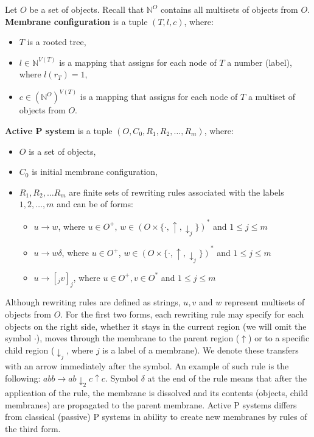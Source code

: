 Let $O$ be a set of objects. Recall that $\mathbb N^O$ contains all multisets of objects from $O$. {\bf Membrane configuration} is a tuple $(T, l, c)$, where:
\begin{itemize}
  \item $T$ is a rooted tree,
  \item $l\in\mathbb N^{V(T)}$ is a mapping that assigns for each node of $T$ a number (label), where $l(r_T)=1$,
  \item $c\in(\mathbb N^O)^{V(T)}$ is a mapping that assigns for each node of $T$ a multiset of objects from $O$.
\end{itemize}

{\bf Active P system} is a tuple $(O, C_0, R_1, R_2, \dots , R_m)$, where:
\begin{itemize}
  \item $O$ is a set of objects,
  \item $C_0$ is initial membrane configuration,
  \item $R_1,R_2,\dots R_m$ are finite sets of rewriting rules associated with the labels $1,2,\dots,m$ and can be of forms:
  \begin{itemize}
    \item $u\rightarrow w$, where $u\in O^+$, $w\in (O\times\{\cdot, \uparrow, \downarrow_j\})^*$ and $1\leq j\leq m$
    \item $u\rightarrow w\delta$, where $u\in O^+$, $w\in (O\times\{\cdot, \uparrow, \downarrow_j\})^*$ and $1\leq j\leq m$
    \item $u\rightarrow [_j v]_j$, where $u\in O^+, v\in O^*$ and $1\leq j\leq m$
  \end{itemize}
\end{itemize}

Although rewriting rules are defined as strings, $u,v$ and $w$ represent multisets of objects from $O$. For the first two forms, each rewriting rule may specify for each objects on the right side, whether it stays in the current region (we will omit the symbol $\cdot$), moves through the membrane to the parent region ($\uparrow$)
or to a specific child region ($\downarrow_j$, where $j$ is a label of a membrane).
We denote these transfers with an arrow immediately after the symbol.
An example of such rule is the following: $abb\rightarrow ab\downarrow_2 c\uparrow c$.
Symbol $\delta$ at the end of the rule means that after the application of the rule, the membrane is dissolved and its contents (objects, child membranes) are propagated to the parent membrane.
Active P systems differs from classical (passive) P systems in ability to create new membranes by rules of the third form.

